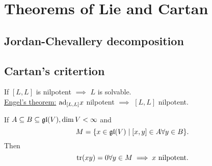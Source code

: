 
\setcounter{chapter}{3}
\chapter{Theorems of Lie and Cartan}
\section{Jordan-Chevallery decomposition}

\section{Cartan's critertion}
\begin{remark}
    If $[L,L]$ is nilpotent $\implies$ $L$ is solvable.\\
    \underline{Engel's theorem:} $\text{ad}_{[L,L]}x$ nilpotent $\implies$ $[L,L]$ nilpotent.
\end{remark}
\begin{lemma}
    If
    $A \subseteq B \subseteq \mathfrak{gl}(V), \dim V < \infty$ and
    $$ M = \{x \in \mathfrak{gl}(V) \mid [x,y] \in A \forall y \in B\}.$$
    Then $$\operatorname{tr} (xy) = 0 \forall y \in M \implies x \text{ nilpotent.}$$
\end{lemma}
